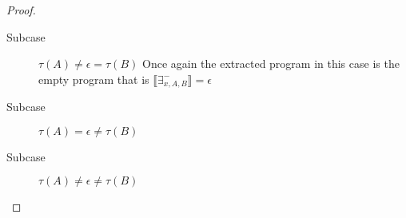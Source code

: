 \begin{mytheorem}
\begin{proof}
\begin{description}
    \item[Subcase] $\tau (A) \neq \epsilon = \tau(B)$ Once again the
      extracted program in this case is the empty program that is $ \llbracket \exists^-_{x,A,B}
      \rrbracket = \epsilon $




    \item[Subcase] $\tau (A) = \epsilon \neq \tau(B)$
    \item[Subcase] $\tau (A) \neq \epsilon \neq \tau(B)$


\end{description}
\end{proof}

\end{mytheorem}


